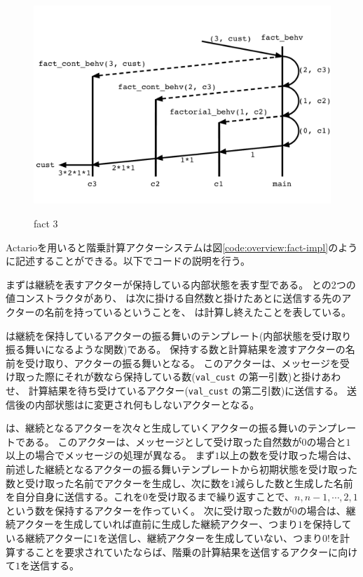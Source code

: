 \begin{figure}[tp]
  \centering
  \includegraphics[width=15cm]{./img/overview/fact.pdf}
  \label{img:overview:fact}
  \caption{fact 3}
\end{figure}

Actarioを用いると階乗計算アクターシステムは図\ref{code:overview:fact-impl}のように記述することができる。以下でコードの説明を行う。

まずは継続を表すアクターが保持している内部状態を表す型である。
との2つの値コンストラクタがあり、
は次に掛ける自然数と掛けたあとに送信する先のアクターの名前を持っているということを、
は計算し終えたことを表している。

は継続を保持しているアクターの振る舞いのテンプレート(内部状態を受け取り振る舞いになるような関数)である。
保持する数と計算結果を渡すアクターの名前を受け取り、アクターの振る舞いとなる。
このアクターは、メッセージを受け取った際にそれが数なら保持している数(\lstinline{val_cust} の第一引数)と掛けあわせ、
計算結果を待ち受けているアクター(\lstinline{val_cust} の第二引数)に送信する。
送信後の内部状態はに変更され何もしないアクターとなる。

は、継続となるアクターを次々と生成していくアクターの振る舞いのテンプレートである。
このアクターは、メッセージとして受け取った自然数が$0$の場合と$1$以上の場合でメッセージの処理が異なる。
まず$1$以上の数を受け取った場合は、前述した継続となるアクターの振る舞いテンプレートから初期状態を受け取った数と受け取った名前でアクターを生成し、次に数を$1$減らした数と生成した名前を自分自身に送信する。これを$0$を受け取るまで繰り返すことで、$n, n - 1, \cdots, 2, 1$ という数を保持するアクターを作っていく。
次に受け取った数が$0$の場合は、継続アクターを生成していれば直前に生成した継続アクター、つまり$1$を保持している継続アクターに$1$を送信し、継続アクターを生成していない、つまり$0!$を計算することを要求されていたならば、階乗の計算結果を送信するアクターに向けて$1$を送信する。

